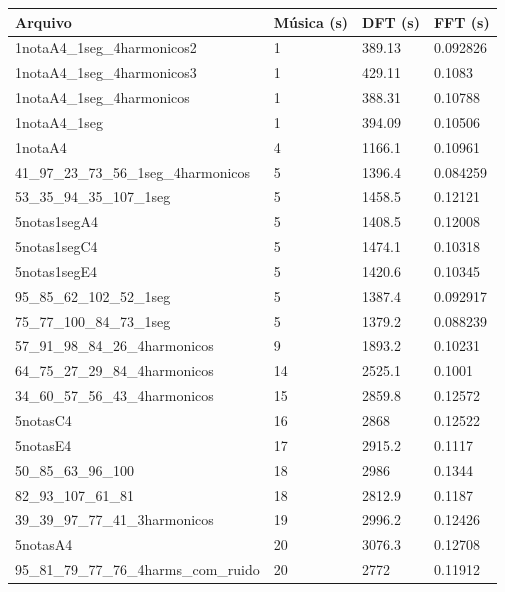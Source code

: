 \documentclass[brazil,times]{abnt}
\begin{document}
\begin{table}	
    \begin{tabular}{|l|l|l|l|}
        \hline
		Arquivo & Música (s) & DFT (s) & FFT (s) \\ \hline
		1notaA4\_1seg\_4harmonicos2 & 1 & 389.13 & 0.092826 \\
		1notaA4\_1seg\_4harmonicos3 & 1 & 429.11 & 0.1083 \\
		1notaA4\_1seg\_4harmonicos & 1 & 388.31 & 0.10788 \\
		1notaA4\_1seg & 1 & 394.09 & 0.10506 \\
		1notaA4 & 4 & 1166.1 & 0.10961 \\
		41\_97\_23\_73\_56\_1seg\_4harmonicos & 5 & 1396.4 & 0.084259 \\
		53\_35\_94\_35\_107\_1seg & 5 & 1458.5 & 0.12121 \\
		5notas1segA4 & 5 & 1408.5 & 0.12008 \\
		5notas1segC4 & 5 & 1474.1 & 0.10318 \\
		5notas1segE4 & 5 & 1420.6 & 0.10345 \\
		95\_85\_62\_102\_52\_1seg & 5 & 1387.4 & 0.092917 \\
		75\_77\_100\_84\_73\_1seg & 5 & 1379.2 & 0.088239 \\
		57\_91\_98\_84\_26\_4harmonicos & 9 & 1893.2 & 0.10231 \\
		64\_75\_27\_29\_84\_4harmonicos & 14 & 2525.1 & 0.1001 \\
		34\_60\_57\_56\_43\_4harmonicos & 15 & 2859.8 & 0.12572 \\
		5notasC4 & 16 & 2868 & 0.12522 \\
		5notasE4 & 17 & 2915.2 & 0.1117 \\
		50\_85\_63\_96\_100 & 18 & 2986 & 0.1344 \\
		82\_93\_107\_61\_81 & 18 & 2812.9 & 0.1187 \\
		39\_39\_97\_77\_41\_3harmonicos & 19 & 2996.2 & 0.12426 \\
		5notasA4 & 20 & 3076.3 & 0.12708 \\
		95\_81\_79\_77\_76\_4harms\_com\_ruido & 20 & 2772 & 0.11912 \\
        \hline
    \end{tabular}
\end{table}
\end{document}
